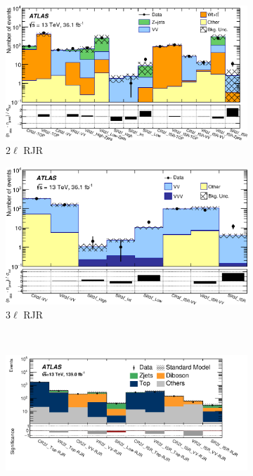 \begin{figure}[tp]
\centering
\begin{subfigure}{0.48\textwidth}
\centering
\includegraphics[width=\textwidth]{figures/2ljets_rjr_23l_2l_summary.png}
\caption{$2\ell$ RJR~\cite{atlas_rjr_23l_SUSY_2017_03}}
\label{fig:2ljets_rjr_summaries_2017_2l}
\end{subfigure}
\hfill
\begin{subfigure}{0.48\textwidth}
\centering
\includegraphics[width=\textwidth]{figures/2ljets_rjr_23l_3l_summary.png}
\caption{$3\ell$ RJR~\cite{atlas_rjr_23l_SUSY_2017_03}}
\label{fig:2ljets_rjr_summaries_2017_3l}
\end{subfigure}
\\[0.5em]
\begin{subfigure}{0.9\textwidth}
\centering
\includegraphics[width=\textwidth]{figures/2ljets_rjr_summary_log.pdf}

\end{subfigure}
\end{figure}
